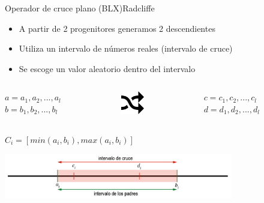 \documentclass[10pt]{beamer}
\begin{document}
\begin{frame}{Operador de cruce plano (BLX)}{Radcliffe}
	\begin{itemize}
		\item A partir de 2 progenitores generamos 2 descendientes
		\item Utiliza un intervalo de números reales (intervalo de cruce)
		\item Se escoge un valor aleatorio dentro del intervalo
		
	\end{itemize}
		\begin{columns}[t]
			\begin{column}{0.4\textwidth}
				\begin{flushright}
					$a=a_{1} , a_{2}, ... , a_{l}$
					\\ $b=b_{1} , b_{2}, ... , b_{l}$ 
				\end{flushright}
			\end{column}
			\begin{column}{0.2\textwidth}
				\begin{center}
					\includegraphics[width=1cm]{arrow}
				\end{center}
			\end{column}
			\begin{column}{0.4\textwidth}
				\begin{flushleft}
					$c=c_{1} , c_{2}, ... , c_{l}$
					\\ $d=d_{1} , d_{2}, ... , d_{l}$ 
				\end{flushleft}
			\end{column}
	\end{columns}
	
	\begin{center}
		$C_{i}=[min(a_i,b_i) , max(a_i,b_i)]$
		
		\vspace{5mm}
		\includegraphics[width=10cm]{cruceplano}
	\end{center}
	

	
	
\end{frame}
\end{document}
